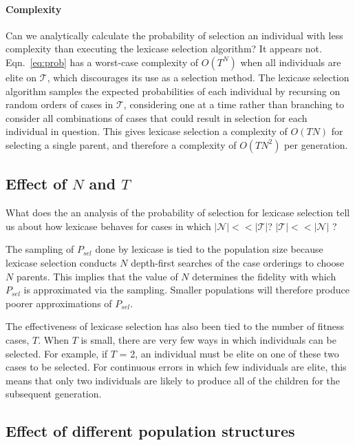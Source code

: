 \documentclass[preprint]{article}
\begin{document}
\paragraph{Complexity}
Can we analytically calculate the probability of selection an individual with less complexity than executing the lexicase selection algorithm? It appears not. Eqn.~\ref{eq:prob} has a worst-case complexity of $O(T^N)$ when all individuals are elite on $\mathcal{T}$, which discourages its use as a selection method. The lexicase selection algorithm samples the expected probabilities of each individual by recursing on random orders of cases in $\mathcal{T}$, considering one at a time rather than branching to consider all combinations of cases that could result in selection for each individual in question. This gives lexicase selection a complexity of $O(TN)$ for selecting a single parent, and therefore a complexity of $O(TN^2)$ per generation. 


 
\subsection{Effect of $N$ and $T$}
What does the an analysis of the probability of selection for lexicase selection tell us about how lexicase behaves for cases in which $|\mathcal{N}| << |\mathcal{T}|$?   $|\mathcal{T}| << |\mathcal{N}|$ ? 

The sampling of $P_{sel}$ done by lexicase is tied to the population size because lexicase selection conducts $N$ depth-first searches of the case orderings to choose $N$ parents. This implies that the value of $N$ determines the fidelity with which $P_{sel}$ is approximated via the sampling. Smaller populations will therefore produce poorer approximations of $P_{sel}$. 

The effectiveness of lexicase selection has also been tied to the number of fitness cases, $T$. When $T$ is small, there are very few ways in which individuals can be selected. For example, if $T$ = 2, an individual must be elite on one of these two cases to be selected. For continuous errors in which few individuals are elite, this means that only two individuals are likely to produce all of the children for the subsequent generation.

\subsection{Effect of different population structures}
\end{document}
